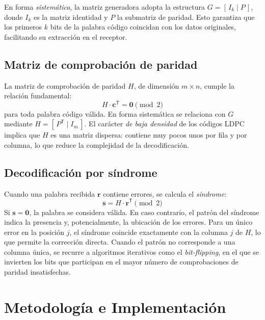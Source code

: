 \documentclass[conference]{IEEEtran}
\begin{document}
En forma \emph{sistemática}, la matriz generadora adopta la estructura $G = [\,I_k \mid P\,]$, donde $I_k$ es la matriz identidad y $P$ la submatriz de paridad. Esto garantiza que los primeros $k$ bits de la palabra código coincidan con los datos originales, facilitando su extracción en el receptor.

\subsection{Matriz de comprobación de paridad}
La matriz de comprobación de paridad $H$, de dimensión $m \times n$, cumple la relación fundamental:
\begin{equation}
H \cdot \mathbf{c}^{\mathsf{T}} = \mathbf{0} \pmod 2
\end{equation}
para toda palabra código válida. En forma sistemática se relaciona con $G$ mediante $H = [\,P^{\mathsf{T}} \mid I_m\,]$. El carácter \emph{de baja densidad} de los códigos LDPC implica que $H$ es una matriz dispersa: contiene muy pocos unos por fila y por columna, lo que reduce la complejidad de la decodificación.

\subsection{Decodificación por síndrome}
Cuando una palabra recibida $\mathbf{r}$ contiene errores, se calcula el \emph{síndrome}:
\begin{equation}
\mathbf{s} = H \cdot \mathbf{r}^{\mathsf{T}} \pmod 2
\end{equation}
Si $\mathbf{s} = \mathbf{0}$, la palabra se considera válida. En caso contrario, el patrón del síndrome indica la presencia y, potencialmente, la ubicación de los errores. Para un único error en la posición $j$, el síndrome coincide exactamente con la columna $j$ de $H$, lo que permite la corrección directa. Cuando el patrón no corresponde a una columna única, se recurre a algoritmos iterativos como el \emph{bit-flipping}, en el que se invierten los bits que participan en el mayor número de comprobaciones de paridad insatisfechas.

\section{Metodología e Implementación}
\end{document}
